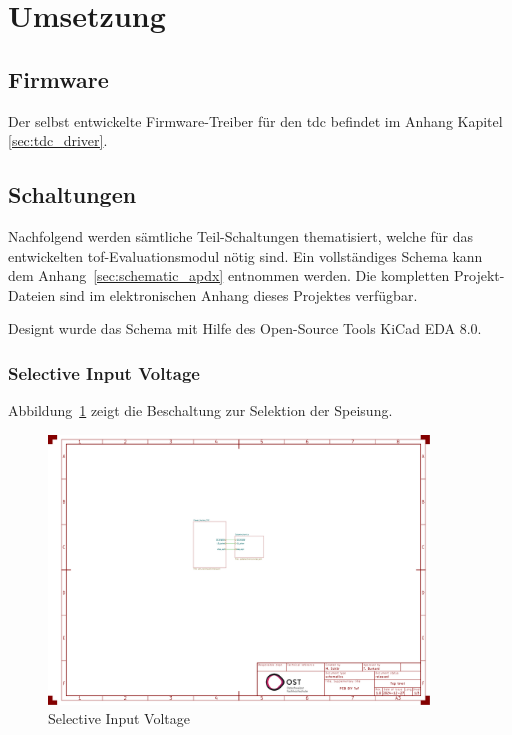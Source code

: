 \documentclass[11pt,a4paper,hidelinks]{article}
\begin{document}
\section{Umsetzung}

\subsection{Firmware}

Der selbst entwickelte Firmware-Treiber für den \acrshort{tdc} befindet im Anhang Kapitel \ref{sec:tdc_driver}.

\pagebreak

\subsection{Schaltungen}
Nachfolgend werden sämtliche Teil-Schaltungen thematisiert, welche für das entwickelten \acrshort{tof}-Evaluationsmodul
nötig sind. Ein vollständiges Schema kann dem Anhang~\ref{sec:schematic_apdx} entnommen werden. Die kompletten
Projekt-Dateien sind im elektronischen Anhang dieses Projektes verfügbar.

Designt wurde das Schema mit Hilfe des Open-Source Tools \dq KiCad EDA 8.0\dq.

\subsubsection{Selective Input Voltage}

Abbildung~\ref{fig:selective_input_voltage} zeigt die Beschaltung zur Selektion der Speisung.

\begin{figure}[H]
    \centering
    \includegraphics[page=2, trim=80 590 750 50, clip, width=0.9\textwidth]{attachments/schematic.pdf}
    \caption{Selective Input Voltage}\label{fig:selective_input_voltage}
\end{figure}
\end{document}

